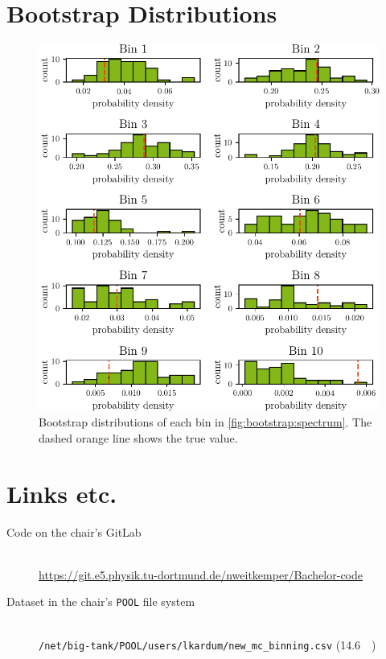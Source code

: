 %

\clearpage
\section{Bootstrap Distributions}
\begin{figure}
  \centering
  \includegraphics[scale=1]{content/plots/bootstrap:distributions_doubleheight.pdf}
  \caption{
    Bootstrap distributions of each bin in \autoref{fig:bootstrap:spectrum}.
    The dashed orange line shows the true value.
  }
  \label{fig:bootstrap:distributions}
\end{figure}


\clearpage
\section{Links etc.}
\begin{description}
  \item[Code on the chair's GitLab] \hfill \\
    \url{https://git.e5.physik.tu-dortmund.de/nweitkemper/Bachelor-code}
  \item[Dataset in the chair's \texttt{POOL} file system] \hfill \\
    \texttt{/net/big-tank/POOL/users/lkardum/new\_mc\_binning.csv} (\SI{14.6}{\giga\byte})
\end{description}
